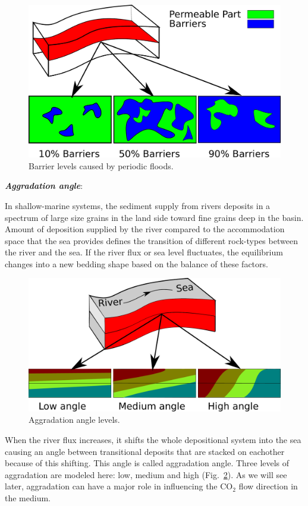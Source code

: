 \begin{figure}[thb]
  \centering
  \includegraphics[width=0.65 \linewidth]{./figurer/barrier} 
  \caption{Barrier levels caused by periodic floods.}
  \label{fig:barriers}
%
\end{figure}

\textbf{\textit{Aggradation angle}}:

In shallow-marine systems, the sediment supply from rivers deposits in a
spectrum of large size grains in the land side toward fine grains deep in the
basin. Amount of deposition supplied by the river compared to the accommodation
space that the sea provides defines the transition of different rock-types
between the river and the sea. If the river flux or sea level
fluctuates, the equilibrium changes into a new bedding shape based on the
balance of these
factors.

\begin{figure}[thb]
  \centering
  \includegraphics[width=0.65 \linewidth]{./figurer/agr} 
  \caption{Aggradation angle levels.}
  \label{fig:agrLvl}
%
\end{figure}

When the river flux increases, it shifts the whole depositional system into the
sea causing an  angle between transitional deposits that are stacked on
eachother because of this shifting. This angle is called aggradation angle.
Three levels of aggradation are modeled here: low, medium and
high (Fig.~\ref{fig:agrLvl}). As we will see later, aggradation can have a major
role in influencing the $\mbox{CO}_2$ flow direction in the medium. 

